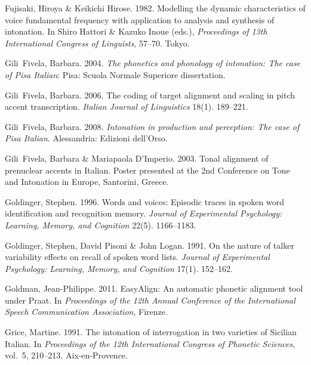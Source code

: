 \documentclass[ number=1
,series=labphon
,output=long
,url=http://langsci-press.org/catalog/book/16
,isbn=978-3-944675-01-5
]{LSP/langsci}
\begin{document}
\begin{thebibliography}{284}
Fujisaki, Hiroya \& Keikichi Hirose. 1982.
\newblock Modelling the dynamic characteristics of voice fundamental frequency
  with application to analysis and synthesis of intonation.
\newblock In Shiro Hattori \& Kazuko Inoue (eds.), \emph{Proceedings of 13th
  {International Congress of Linguists}}, 57--70. Tokyo.

Gili~Fivela, Barbara. 2004.
\newblock \emph{The phonetics and phonology of intonation: {T}he case of {P}isa
  {I}talian}: Pisa: Scuola Normale Superiore dissertation.

Gili~Fivela, Barbara. 2006.
\newblock The coding of target alignment and scaling in pitch accent
  transcription.
\newblock \emph{Italian Journal of Linguistics} 18(1). 189--221.

Gili~Fivela, Barbara. 2008.
\newblock \emph{Intonation in production and perception: {T}he case of {P}isa
  {I}talian}.
\newblock Alessandria: Edizioni dell'{O}rso.

Gili~Fivela, Barbara \& Mariapaola D'Imperio. 2003.
\newblock Tonal alignment of prenuclear accents in {I}talian.
\newblock Poster presented at the 2nd Conference on Tone and Intonation in
  Europe, Santorini, Greece.

Goldinger, Stephen. 1996.
\newblock Words and voices: {E}pisodic traces in spoken word identification and
  recognition memory.
\newblock \emph{Journal of Experimental Psychology: Learning, Memory, and
  Cognition} 22(5). 1166--1183.

Goldinger, Stephen, David Pisoni \& John Logan. 1991.
\newblock On the nature of talker variability effects on recall of spoken word
  lists.
\newblock \emph{Journal of Experimental Psychology: Learning, Memory, and
  Cognition} 17(1). 152--162.

Goldman, Jean-Philippe. 2011.
\newblock Easy{A}lign: {A}n automatic phonetic alignment tool under {P}raat.
\newblock In \emph{Proceedings of the 12th {Annual Conference of the
  International Speech Communication Association}}, Firenze.

Grice, Martine. 1991.
\newblock The intonation of interrogation in two varieties of {S}icilian
  {I}talian.
\newblock In \emph{Proceedings of the 12th {I}nternational {C}ongress of
  {P}honetic {S}ciences}, vol.~5, 210--213. Aix-en-Provence.


\end{thebibliography}
\end{document}
